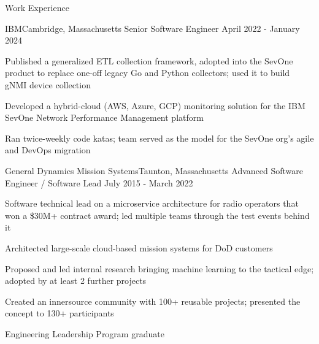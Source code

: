 \documentclass{resume} %
\begin{document}
\begin{rSection}{Work Experience}
\begin{rSubsection}{IBM}{Cambridge, Massachusetts}
{Senior Software Engineer}
{April 2022 - January 2024}
\item Published a generalized ETL collection framework, adopted into the SevOne product to replace one-off legacy Go and Python collectors; used it to build gNMI device collection
\item Developed a hybrid-cloud (AWS, Azure, GCP) monitoring solution for the IBM SevOne Network Performance Management platform
\item Ran twice-weekly code katas; team served as the model for the SevOne org's agile and DevOps migration
\end{rSubsection}

\begin{rSubsection}{General Dynamics Mission Systems}{Taunton, Massachusetts}
{Advanced Software Engineer / Software Lead}
{July 2015 - March 2022}
 \item Software technical lead on a microservice architecture for radio operators that won a \$30M+ contract award; led multiple teams through the test events behind it
 \item Architected large-scale cloud-based mission systems for DoD customers
 \item Proposed and led internal research bringing machine learning to the tactical edge; adopted by at least 2 further projects
 \item Created an innersource community with 100+ reusable projects; presented the concept to 130+ participants
 \item Engineering Leadership Program graduate
\end{rSubsection}

\end{rSection}
\end{document}
